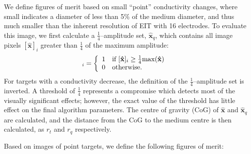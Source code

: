 \documentclass[12pt]{iopart}
\newcommand{\xH}{\mbox{$\mathbf{\hat x}$}}
\begin{document}
We define figures of merit based on small ``point''
conductivity changes, where small indicates a diameter
of less than 5\% of the medium diameter, and thus
much smaller than the inherent resolution of EIT with
16 electrodes.
To evaluate this image, we first calculate
a $\frac{1}{4}$--amplitude set, $\xH_q$, which
contains all image pixels $[\xH]_i$ greater
than $\frac{1}{4}$ of the maximum amplitude:
\begin{equation}
[\xH_q]_i = \left\{ \begin{array}{ll}
    1 & \mbox{if~} [\xH]_i  \geq \mbox{$ \frac{1}{4}\mathrm{max}(\xH)$ } \\
    0 & \mbox{otherwise}.
\end{array} \right.
\end{equation}
For targets
with a conductivity decrease, the definition
of the $\frac{1}{4}$--amplitude set is inverted.
A threshold of $\frac{1}{4}$ represents a compromise
which detects most of the visually significant effects;
however, the exact value of the threshold has little effect on
the final algorithm parameters.
The centre of gravity (CoG) of $\xH$ and $\xH_q$ are
calculated, and the distance from the CoG to the 
medium centre is then calculated, as $r_t$ and $r_q$
respectively.

Based on images of point targets, we define the following
figures of merit:
\end{document}
